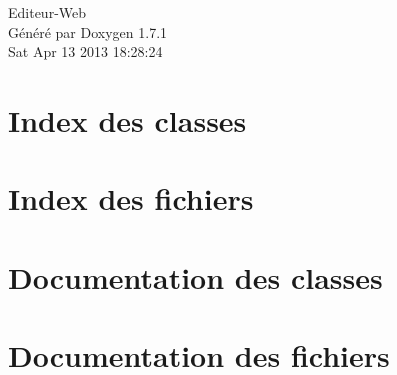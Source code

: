 \documentclass[a4paper]{book}
\begin{document}
\hypersetup{pageanchor=false}
\begin{titlepage}
\vspace*{7cm}
\begin{center}
{\Large Editeur-\/Web }\\
\vspace*{1cm}
{\large Généré par Doxygen 1.7.1}\\
\vspace*{0.5cm}
{\small Sat Apr 13 2013 18:28:24}\\
\end{center}
\end{titlepage}
\clearemptydoublepage
{}
\tableofcontents
\clearemptydoublepage
{}
\hypersetup{pageanchor=true}
\chapter{Index des classes}

\chapter{Index des fichiers}

\chapter{Documentation des classes}









\chapter{Documentation des fichiers}



\printindex
\end{document}
